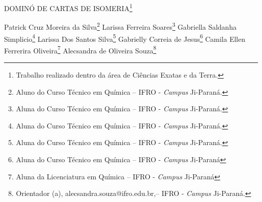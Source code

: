 \documentclass[article,12pt,onesidea,4paper,english,brazil]{abntex2}
\begin{document}
	
	
	\frenchspacing 
	
	\begin{center}
		\LARGE DOMINÓ DE CARTAS DE ISOMERIA\footnote{Trabalho realizado dentro da área de Ciências Exatas e da Terra.}
		
		\normalsize
		Patrick Cruz Moreira da Silva\footnote{Aluno do Curso Técnico em Química – IFRO - \textit{Campus} Ji-Paraná.} 
		Larissa Ferreira Soares\footnote{Aluna do Curso Técnico em Química – IFRO - \textit{Campus} Ji-Paraná.} 
		Gabriella Saldanha Simplicio\footnote{Aluna do Curso Técnico em Química – IFRO - \textit{Campus} Ji-Paraná.} 
		Larissa Dos Santos Silva\footnote{Aluna do Curso Técnico em Química – IFRO - \textit{Campus} Ji-Paraná.}
		Gabrielly Correia de Jesus\footnote{Aluna do Curso Técnico em Química – IFRO - \textit{Campus} Ji-Paraná}
		Camila Ellen Ferrerira Oliveira\footnote{Aluna da Licenciatura em Química – IFRO - \textit{Campus} Ji-Paraná}
		Alecsandra de Oliveira Souza\footnote{Orientador (a), alecsandra.souza@ifro.edu.br,– IFRO - \textit{Campus} Ji-Paraná.} 
	\end{center}
	
\end{document}

